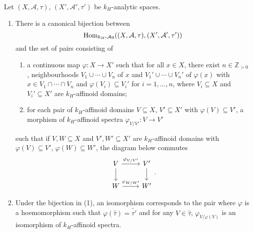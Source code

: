 \begin{proposition}\label{prop-morphismkhanalyt}
    Let $(X,\mathcal{A},\tau)$, $(X',\mathcal{A}',\tau')$ be $k_H$-analytic spaces. 
    \begin{enumerate}
        \item There is a canonical bijection between 
        \[
            \operatorname{Hom}_{k_H\text{-}\mathcal{A}\mathrm{n}}((X,\mathcal{A},\tau),(X',\mathcal{A}',\tau'))
        \]
        and the set of pairs consisting of 
        \begin{enumerate}
            \item a continuous map $\varphi:X\rightarrow X'$ such that for all $x\in X$, there exist $n\in \mathbb{Z}_{>0}$, neighbourhoods $V_1\cup \cdots\cup V_n$ of $x$ and $V_1'\cup\cdots\cup V_n'$ of $\varphi(x)$ with $x\in V_1\cap \cdots\cap V_n$ and $\varphi(V_i)\subseteq V_i'$ for $i=1,\ldots,n$, where $V_i\subseteq X$ and $V_i'\subseteq X'$ are $k_H$-affinoid domains;
            \item for each pair of $k_H$-affinoid domains $V\subseteq X$, $V'\subseteq X'$ with $\varphi(V)\subseteq V'$, a morphism of $k_H$-affinoid spectra $\varphi_{V/V'}:V\rightarrow V'$
        \end{enumerate}
        such that if $V,W\subseteq X$ and $V',W'\subseteq X'$ are $k_H$-affinoid domains with $\varphi(V)\subseteq V'$, $\varphi(W)\subseteq W'$, the diagram below commutes
        \[
            \begin{tikzcd}
                V \arrow[r, "\varphi_{V/V'}"] \arrow[d] & V' \arrow[d] \\
                W \arrow[r, "\varphi_{W/W'}"]           & W'          
            \end{tikzcd}.  
        \]
        \item Under the bijection in (1), an isomorphism corresponds to the pair where $\varphi$ is a hoemomorphism such that $\varphi(\hat{\tau})=\widetilde{\tau'}$ and for any $V\in \hat{\tau}$, $\varphi_{V/\varphi(V)}$ is an isomorphism of $k_H$-affinoid spectra.
    \end{enumerate}
\end{proposition}
